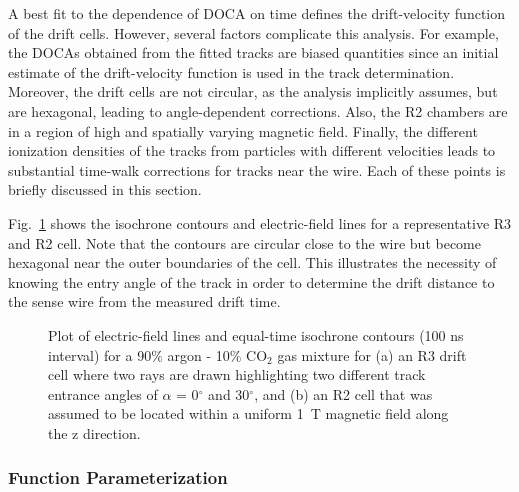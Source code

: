 A best fit to the dependence of DOCA on time defines the 
drift-velocity function of the drift cells. However, several factors 
complicate this analysis. For example, the DOCAs obtained from the fitted 
tracks are biased quantities since an initial estimate of the drift-velocity 
function is used in the track determination.  Moreover, the drift cells are 
not circular, as the analysis implicitly assumes, but are hexagonal, leading 
to angle-dependent corrections.   Also, the R2 chambers are in a 
region of high and spatially varying magnetic field.  Finally, the different 
ionization densities of the tracks from particles with different velocities 
leads to substantial time-walk corrections for tracks near the wire.  Each of 
these points is briefly discussed in this section.

Fig.~\ref{garfield-isochrones} shows the isochrone contours and electric-field lines for 
a representative R3 and R2 cell.  Note that the contours are circular close 
to the wire but become hexagonal near the outer boundaries of the cell.  This 
illustrates the necessity of knowing the entry angle of the track in order to 
determine the drift distance to the sense wire from the measured drift time.

\begin{figure}[htpb]
\vspace{4.5cm} 
\caption{\small{Plot of electric-field lines and equal-time isochrone contours
(100 ns interval) for a 90$\%$ argon - 10$\%$ CO$_2$ gas mixture for (a) an R3
drift cell where two rays are drawn highlighting two different track entrance 
angles of $\alpha$ = 0$^{\circ}$ and 30$^{\circ}$, and (b) an R2 cell that 
was assumed to be located within a uniform 1~T magnetic field along the z 
direction.}}
\label{garfield-isochrones}
\end{figure}

\subsubsection{Function Parameterization}
\label{funcpar} 

